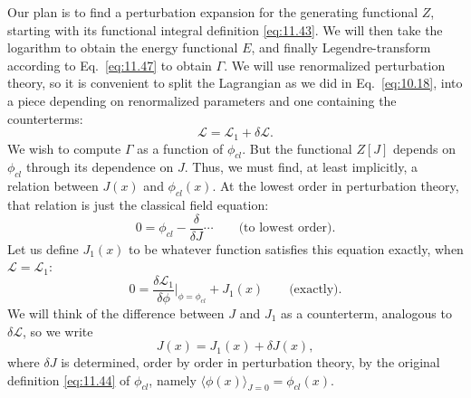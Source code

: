 Our plan is to find a perturbation expansion for the generating functional
$Z$, starting with its functional integral definition \eqref{eq:11.43}.  We
will then take the logarithm to obtain the energy functional $E$, and finally
Legendre-transform according to Eq.~\eqref{eq:11.47} to obtain $\Gamma$.  We
will use renormalized perturbation theory, so it is convenient to split the
Lagrangian as we did in Eq.~\eqref{eq:10.18}, into a piece depending on
renormalized parameters and one containing the counterterms:
\begin{equation}
  \mathcal{L} = \mathcal{L}_1 + \delta\mathcal{L} .
  \label{eq:11.54}
\end{equation}
We wish to compute $\Gamma$ as a function of $\phi_{cl}$.  But the functional
$Z[J]$ depends on $\phi_{cl}$ through its dependence on $J$.  Thus, we must
find, at least implicitly, a relation between $J(x)$ and $\phi_{cl}(x)$.  At
the lowest order in perturbation theory, that relation is just the classical
field equation:
\begin{equation}
  0 = \phi_{cl} - \frac{\delta}{\delta J} \cdots
  \qquad\text{(to lowest order)} .
\end{equation}
Let us define $J_1(x)$ to be whatever function satisfies this equation
exactly, when $\mathcal{L} = \mathcal{L}_1$:
\begin{equation}
  0 = \frac{\delta\mathcal{L}_1}{\delta\phi}\Big|_{\phi=\phi_{cl}}
    + J_1(x) \qquad \text{(exactly)} .
  \label{eq:11.55}
\end{equation}
We will think of the difference between $J$ and $J_1$ as a counterterm,
analogous to $\delta\mathcal{L}$, so we write
\begin{equation}
  J(x) = J_1(x) + \delta J(x) ,
  \label{eq:11.56}
\end{equation}
where $\delta J$ is determined, order by order in perturbation theory, by the
original definition \eqref{eq:11.44} of $\phi_{cl}$, namely
$\langle\phi(x)\rangle_{J=0} = \phi_{cl}(x)$.

